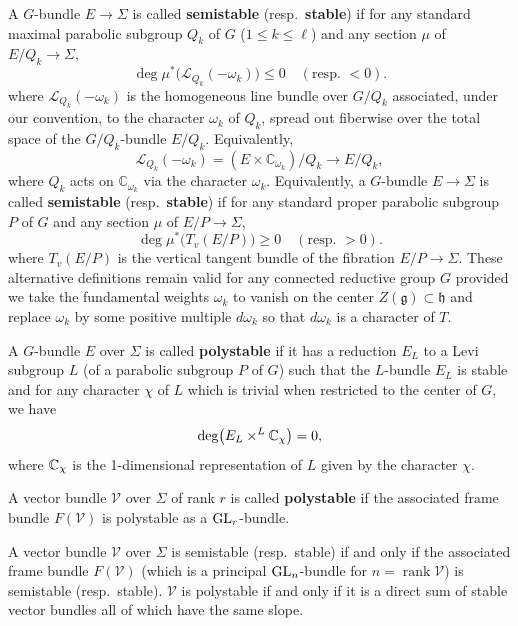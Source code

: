 \documentclass[12pt]{article}
\begin{document}
\begin{definition}
A \(G\)-bundle \(E \to \Sigma\) is called \textbf{semistable} (resp.\ \textbf{stable}) if for any standard maximal parabolic subgroup \(Q_k\) of \(G\) (\(1\le k\le \ell\)) and any section \(\mu\) of \(E/Q_k \to \Sigma\),
\[
\deg \mu^*\bigl(\mathcal L_{Q_k}(-\omega_k)\bigr) \le 0
\quad (\text{resp.\ } < 0).
\]
where \(\mathcal L_{Q_k}(-\omega_k)\) is the homogeneous line bundle over
\(G/Q_k\) associated, under our convention, to the character \(\omega_k\) of
\(Q_k\), spread out fiberwise over the total space of the \(G/Q_k\)-bundle
\(E/Q_k\). Equivalently,
\[
\mathcal L_{Q_k}(-\omega_k)
=
(E\times \mathbb C_{\omega_k})/Q_k
\longrightarrow E/Q_k,
\]
where \(Q_k\) acts on \(\mathbb C_{\omega_k}\) via the character \(\omega_k\). Equivalently, a \(G\)-bundle \(E \to \Sigma\) is called \textbf{semistable} (resp.\ \textbf{stable}) if for any standard proper parabolic subgroup \(P\) of \(G\) and any section \(\mu\) of \(E/P \to \Sigma\),
\[
\deg \mu^*\bigl(T_v(E/P)\bigr) \ge 0
\quad (\text{resp.\ } > 0).
\]
where \(T_v(E/P)\) is the vertical tangent bundle of the fibration \(E/P \to \Sigma\).
These alternative definitions remain valid for any connected reductive group \(G\) provided we take the fundamental weights \(\omega_k\) to vanish on the center \(Z(\mathfrak g)\subset \mathfrak h\) and replace \(\omega_k\) by some positive multiple \(d\omega_k\) so that \(d\omega_k\) is a character of \(T\).


A \(G\)-bundle \(E\) over \(\Sigma\) is called \textbf{polystable} if it has a reduction \(E_L\) to a Levi subgroup \(L\)
(of a parabolic subgroup \(P\) of \(G\)) such that the \(L\)-bundle \(E_L\) is stable and for any character \(\chi\) of \(L\) which is trivial when restricted to the center of \(G\), we have
\[
\deg\bigl(E_L \times^L \mathbb{C}_\chi\bigr)=0,
\]
where \(\mathbb{C}_\chi\) is the 1-dimensional representation of \(L\) given by the character \(\chi\).

A vector bundle \(\mathcal V\) over \(\Sigma\) of rank \(r\) is called \textbf{polystable} if the associated frame bundle \(F(\mathcal V)\) is polystable as a \(\operatorname{GL}_r\)-bundle. 
\end{definition}
A vector bundle \(\mathcal V\) over \(\Sigma\) is semistable (resp.\ stable) if and only if the associated frame bundle \(F(\mathcal V)\) (which is a principal \(\operatorname{GL}_n\)-bundle for \(n=\operatorname{rank}\mathcal V\)) is semistable (resp.\ stable). \(\mathcal V\) is polystable if and only if it is a direct sum of stable vector bundles all of which have the same slope.
\end{document}
